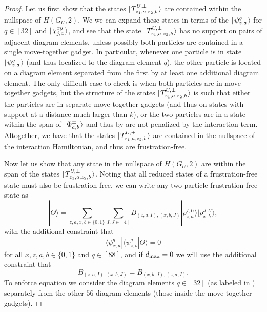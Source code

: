 \documentclass[../thesis-main/thesis-main]{subfiles}
\begin{document}
\begin{proof}

Let us first show that the states $|\mspace{2mu} T_{z_1,a,z_2,b}^{U,\pm} \mspace{2mu} \rangle$ are contained within the nullspace of $H(G_U,2)$.   We we can expand these states in terms of the $|\mspace{2mu} \psi^q_{z,a} \mspace{2mu} \rangle$ for $q\in[32]$ and $|\mspace{2mu} \chi_{j,a}^{xy} \mspace{2mu} \rangle$, and see that the state $|\mspace{2mu} T_{z_1,a,z_2,b}^{U,\pm} \mspace{2mu} \rangle$ has no support on pairs of adjacent diagram elements, unless possibly both particles are contained in a single move-together gadget.   In particular, whenever one particle is in state $|\mspace{2mu} \psi^q_{z,a} \mspace{2mu} \rangle$ (and thus localized to the diagram element $q$), the other particle is located on a diagram element separated from the first by at least one additional diagram element.  The only difficult case to check is when both particles are in move-together gadgets, but the structure of the states $|\mspace{2mu} T_{z_1,a,z_2,b}^{U,\pm} \mspace{2mu} \rangle$ is such that either the particles are in separate move-together gadgets (and thus on states with support at a distance much larger than $k$), or the two particles are in a state within the span of $|\mspace{2mu} \Phi_{a,b}^{\pm} \mspace{2mu} \rangle$ and thus by  are not penalized by the interaction term.  Altogether, we have that the states $|\mspace{2mu} T_{z_1,a,z_2,b}^{U,\pm} \mspace{2mu} \rangle$ are contained in the nullspace of the interaction Hamiltonian, and thus are frustration-free.

Now let us show that any state in the nullspace of $H(G_U,2)$ are within the span of the states $|\mspace{2mu} T_{z_1,a,z_2,b}^{U,\pm} \mspace{2mu} \rangle$. Noting that all reduced states of a frustration-free state must also be frustration-free, we can write any two-particle frustration-free state as 
\begin{equation}
  |\Theta\rangle=\sum_{z,a,x,b\in \{0,1\}}\sum_{I,J\in [4]}B_{\left(z,a,I\right),\left(x,b,J\right)}|\rho_{z,a}^{I,U}\rangle|\rho_{x,b}^{J,U}\rangle
\label{eq:thetastate},
\end{equation}
with the additional constraint that 
\begin{equation}
\langle\psi_{x,a}^{q}|\langle\psi_{z,b}^{q}|\Theta\rangle=0\label{eq:ff_condition}
\end{equation}
for all $x,z,a,b\in\{0,1\}$ and $q\in[88]$, and if $d_{\text{max}} = 0$ we will use the additional constraint that 
\begin{equation}
B_{\left(z,a,I\right),\left(x,b,J\right)}=B_{\left(x,b,J\right),\left(z,a,I\right)}. \label{eq:sym_B}
\end{equation}
 To enforce equation  we consider the diagram elements $q\in [32]$ (as labeled in ) separately from the other $56$ diagram elements (those inside the move-together gadgets). 


\end{proof}
\end{document}
